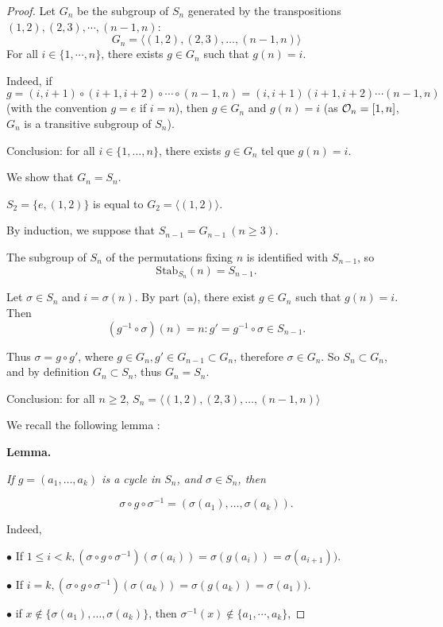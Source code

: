 \documentclass[11pt,a4paper]{article}
\begin{document}
\begin{proof}
Let $G_n$  be the subgroup of $S_n$ generated by the transpositions $(1,2),(2,3),\cdots,{(n-1,n)}$:
$$G_n=\langle (1,2), (2,3),\ldots,(n-1,n) \rangle$$
 For all $i\in \{1,\cdots,n\}$, there exists $g\in G_n$ such that $g(n) = i$.

Indeed, if  $g = (i,i+1) \circ (i+1,i+2)\circ \cdots \circ (n-1,n)  =  (i,i+1) (i+1,i+2)\cdots (n-1,n)$  (with the convention $g=e$ if $i=n$), then  $g \in G_n$ and $g(n) = i$
(as ${\cal O}_n = [1,n]$, $G_n$ is a transitive subgroup of $S_n$).

Conclusion: for all $i \in \{1,\ldots,n\}$, there exists $g \in G_n$ tel que $g(n) = i$.

\bigskip

We show that $G_n = S_n$.

$S_2 = \{e,(1,2)\}$ is equal to  $G_2=\langle (1,2) \rangle$.

By induction, we suppose that $S_{n-1} = G_{n-1}\ (n\geq 3)$.

The subgroup of  $S_n$ of the permutations fixing $n$ is identified with $S_{n-1}$, so
$$\mathrm{Stab}_{S_n}(n) = S_{n-1}.$$

Let $\sigma \in S_n$ and $i = \sigma(n)$.
By part (a), there exist $g \in G_n$ such that $g(n) = i$. 
Then $$(g^{-1} \circ \sigma)(n) = n :  g' = g^{-1} \circ \sigma \in S_{n-1}.$$

Thus $\sigma = g \circ g'$, where $g \in G_n, g' \in G_{n-1} \subset G_n$, therefore $\sigma \in G_n$.
So $S_n \subset G_n$, and by definition $G_n \subset S_n$, thus $G_n = S_n$.

Conclusion: for all $n\geq 2$, $S_n = \langle (1,2), (2,3),\ldots,(n-1,n) \rangle$

\bigskip

We recall the following lemma :

{\bf Lemma. }{\it If $g=(a_1,\ldots,a_k)$ is a cycle in $S_n$, and $\sigma \in S_n$, then

$$\sigma \circ g \circ \sigma^{-1} = (\sigma(a_1),\ldots, \sigma(a_k)).$$}

Indeed,

$\bullet$ If $1 \leq i <k, (\sigma \circ g \circ \sigma^{-1})(\sigma(a_i)) = \sigma(g(a_i)) = \sigma(a_{i+1}))$.

$\bullet$ If $i = k, (\sigma \circ g \circ \sigma^{-1})(\sigma(a_k)) = \sigma(g(a_k)) = \sigma(a_1))$.

$\bullet$ if $x \not \in \{\sigma(a_1),\ldots,\sigma(a_k)\}$, then $\sigma^{-1}(x) \not \in \{a_1,\cdots,a_k\}$,


\end{proof}
\end{document}
